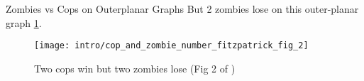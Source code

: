 \begin{frame}{Zombies vs Cops on Outerplanar Graphs}
  But 2 zombies lose on this outer-planar graph \ref{zombie_number_differ}.
  \begin{figure}
    \centering
    \texttt{[image: intro/cop\_and\_zombie\_number\_fitzpatrick\_fig\_2]}
    \caption{Two cops win but two zombies lose (Fig 2 of \cite{fitzpatrick2016deterministic})\label{zombie_number_differ}}
\end{figure}
\end{frame}
